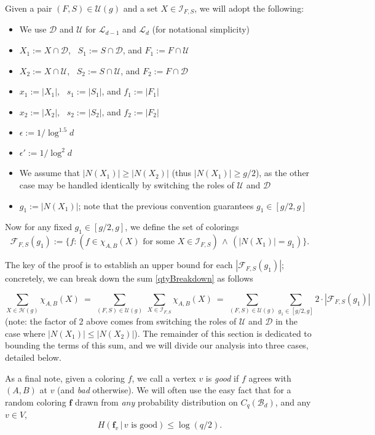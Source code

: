 \documentclass{amsart}
\theoremstyle{definition}
\newcommand{\cB}{\mathcal{B} }
\newcommand{\cD}{\mathcal{D} }
\newcommand{\cF}{\mathcal{F} }
\newcommand{\cH}{\mathcal{H} }
\newcommand{\cI}{\mathcal{I} }
\newcommand{\cL}{\mathcal{L} }
\newcommand{\cU}{\mathcal{U} }
\newcommand{\bbf}{\mathbf{f}}
\newcommand{\beq}[1]{\begin{equation}\label{#1}}
\newcommand{\enq}[0]{\end{equation}}
\newcommand{\eps}{\epsilon}
\newcommand{\0}[0]{\emptyset}
\begin{document}
Given a pair $(F,S)\in \cU(g)$ and a set $X\in \cI_{F,S}$, we will adopt the following:

\begin{itemize}
	\item We use $\cD$ and $\cU$ for $\cL_{d-1}$ and $\cL_d$ (for notational simplicity) 
	\item $X_1:=X \cap \cD$, \ $S_1:=S \cap \cD$, and $F_1:=F \cap \cU$
	\item $X_2:=X \cap \cU$, \ $S_2:=S \cap \cU$, and $F_2:=F \cap \cD$
	\item $x_1:=|X_1|$, \ $s_1:=|S_1|$, and $f_1:=|F_1|$
	\item $x_2:=|X_2|$, \ $s_2:=|S_2|$, and $f_2:=|F_2|$
	\item $\eps:=1/\log^{1.5} d$ 
	\item $\eps':=1/\log^2 d$
	\item We assume that $|N(X_1)| \ge |N(X_2)|$ (thus $|N(X_1)| \ge g/2$), as the other case may be handled identically by switching the roles of $\cU$ and $\cD$
	\item $g_1:=|N(X_1)|$; note that the previous convention guarantees $g_1 \in [g/2,g]$
\end{itemize} 
Now for any fixed $g_1\in [g/2, g]$, we define the set of colorings
\beq{f.chosen}
\cF_{F, S}(g_1):=\big\{f : \left(\mbox{$f \in \chi_{A,B}(X)$ for some $X\in\mathcal{I}_{F, S}$}\right) \,\wedge\, \left(|N(X_1)|=g_1\right)\big\}. \enq

The key of the proof is to establish an upper bound for each $|\cF_{F, S}(g_1)|$; concretely, we can break down the sum \eqref{qtyBreakdown} as follows



\beq{qtyFinalBdown}\sum_{X\in\cH(g)}\chi_{A, B}(X)\ = \
	\sum_{(F,S)\in\cU(g)}\ \sum_{X\in \cI_{F,S}} \chi_{A,B}(X)\ =\ \sum_{(F, S)\in \cU(g)}\sum_{g_1\in[g/2, g]}2\cdot |\cF_{F, S}(g_1)|
\enq
(note: the factor of 2 above comes from switching the roles of $\cU$ and $\cD$ in the case where $|N(X_1)| \le |N(X_2)|$). The remainder of this section is dedicated to bounding the terms of this sum, and we will divide our analysis into three cases, detailed below.



As a final note, given a coloring $f$, we call a vertex $v$ is \textit{good} if $f$ agrees with $(A,B)$ at $v$ (and \textit{bad} otherwise). 
We will often use the easy fact that for a random coloring $\bbf$ drawn from \textit{any} probability distribution on $C_q(\cB_d)$, and any $v\in V$,
\beq{triv.bd} \mbox{$H(\bbf_v\,|\,v \text{ is good}) \le \log (q/2)$.}
\enq
\end{document}
